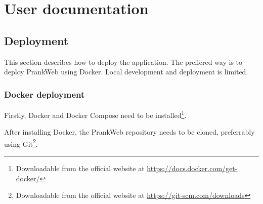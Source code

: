\chapter{User documentation}
\label{chap:user_docs}


\section{Deployment}
\label{sec:deployment}

This section describes how to deploy the application. The preffered way is to deploy PrankWeb using Docker. Local development and deployment is limited.

\subsection{Docker deployment}
\label{subsec:docker_deployment}

Firstly, Docker and Docker Compose need to be installed\footnote{Downloadable from the official website at \url{https://docs.docker.com/get-docker/}}. 

After installing Docker, the PrankWeb repository needs to be cloned, preferrably using Git\footnote{Downloadable from the official website at \url{https://git-scm.com/downloads}}.

